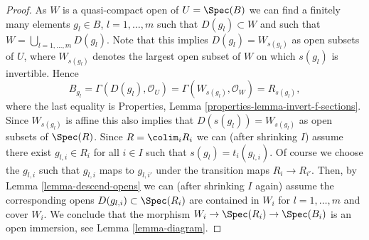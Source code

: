 \begin{proof}
\medskip\noindent
As $W$ is a quasi-compact open of $U = \Spec(B)$
we can find a finitely many elements $g_l \in B$, $l = 1, \ldots, m$
such that $D(g_l) \subset W$ and such that
$W = \bigcup_{l = 1, \ldots, m} D(g_l)$.
Note that this implies $D(g_l) = W_{s(g_l)}$ as open subsets of $U$,
where $W_{s(g_l)}$ denotes the largest open subset of $W$ on which
$s(g_l)$ is invertible. Hence
$$
B_{g_l} =
\Gamma(D(g_l), \mathcal{O}_U) =
\Gamma(W_{s(g_l)}, \mathcal{O}_W) = R_{s(g_l)},
$$
where the last equality is
Properties, Lemma \ref{properties-lemma-invert-f-sections}.
Since $W_{s(g_l)}$ is affine this also
implies that $D(s(g_l)) = W_{s(g_l)}$ as open subsets of $\Spec(R)$.
Since $R = \colim_i R_i$ we can (after shrinking $I$)
assume there exist $g_{l, i} \in R_i$ for all $i \in I$ such that
$s(g_l) = t_i(g_{l, i})$. Of course we choose the $g_{l, i}$
such that $g_{l, i}$ maps to $g_{l, i'}$ under the transition maps
$R_i \to R_{i'}$. Then, by Lemma \ref{lemma-descend-opens} we can
(after shrinking $I$ again)
assume the corresponding opens $D(g_{l, i}) \subset \Spec(R_i)$
are contained in $W_i$ for $l = 1, \ldots, m$ and cover $W_i$.
We conclude that the morphism $W_i \to \Spec(R_i) \to \Spec(B_i)$
is an open immersion, see Lemma \ref{lemma-diagram}.


\end{proof}
